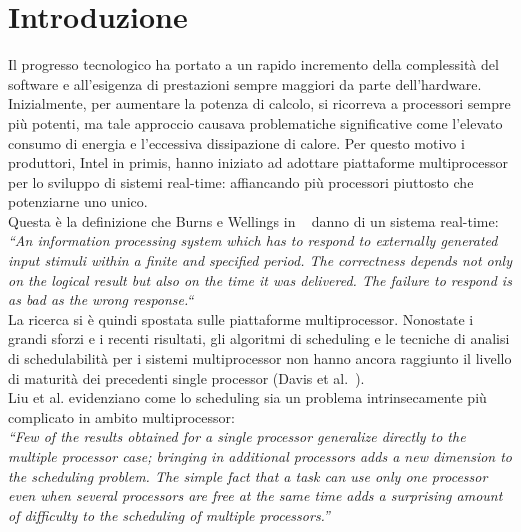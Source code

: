 




\chapter{Introduzione}
\label{sec:introduzione}

Il progresso tecnologico ha portato a un rapido incremento della complessità del software e all'esigenza di prestazioni sempre maggiori da parte dell'hardware. Inizialmente, per aumentare la potenza di calcolo, si ricorreva a processori sempre più potenti, ma tale approccio causava problematiche significative come l'elevato consumo di energia e l'eccessiva dissipazione di calore. Per questo motivo i produttori, Intel in primis, hanno iniziato ad adottare piattaforme multiprocessor per lo sviluppo di sistemi real-time: affiancando più processori piuttosto che potenziarne uno unico.\\

Questa è la definizione che Burns e Wellings in ~\cite{Burns:2009:RSP:1643588} danno di un sistema real-time:\\

\textit{“An information processing system which has to respond to externally generated input stimuli within a finite and specified period. The correctness depends not only on the logical result but also on the time it was delivered. The failure to respond is as bad as the wrong response.“}\\

La ricerca si è quindi spostata sulle piattaforme multiprocessor. Nonostate i grandi sforzi e i recenti risultati, gli algoritmi di scheduling e le tecniche di analisi di schedulabilità per i sistemi multiprocessor non hanno ancora raggiunto il livello di maturità dei precedenti single processor (Davis et al.~\cite{Davis:2011:SHR:1978802.1978814}).\\

Liu et al.\cite{Liu:1973:SAM:321738.321743} evidenziano come lo scheduling sia un problema intrinsecamente più complicato in ambito multiprocessor:\\

\textit{“Few of the results obtained for a single processor generalize directly to the multiple processor case; bringing in additional processors adds a new dimension to the scheduling problem. The simple fact that a task can use only one processor even when several processors are free at the same time adds a surprising amount of difficulty to the scheduling of multiple processors.”}\\

